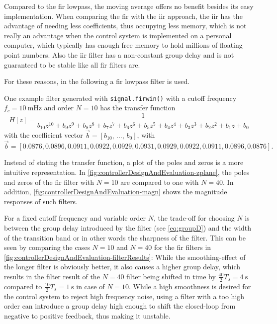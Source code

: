 Compared to the \gls{fir} lowpass, the moving average offers no benefit besides its easy implementation.
When comparing the \gls{fir} with the \gls{iir} approach, the \gls{iir} has the advantage of needing less coefficients, thus occupying less memory, which is not really an advantage when the control system is implemented on a personal computer, which typically has enough free memory to hold millions of floating point numbers.
Also the \gls{iir} filter has a non-constant group delay and is not guaranteed to be stable like all \gls{fir} filters are.

For these reasons, in the following a \gls{fir} lowpass filter is used.

One example filter generated with \texttt{signal.firwin()} with a cutoff frequency $f_c=\SI{10}{\milli\hertz}$ and order $N=10$ has the transfer function
\begin{equation}
H[z]=\frac{1}{b_{10} z^{10} + b_{9} z^9 + b_{8} z^8 + b_{7} z^7 + b_{6} z^6 + b_{5} z^5 + b_{4} z^4 + b_{3} z^3  + b_{2} z^2 + b_{1} z + b_{0}}
\end{equation}
with the coefficient vector $\vec{b}=[b_{10},\,...,\,b_0]$, with
\begin{equation}
\vec{b}=[0.0876,0.0896,0.0911,0.0922,0.0929,0.0931,0.0929,0.0922,0.0911,0.0896,0.0876].
\end{equation}

Instead of stating the transfer function, a plot of the poles and zeros is a more intuitive representation. In \autoref{fig:controllerDesignAndEvaluation-zplane}, the poles and zeros of the \gls{fir} filter with $N=10$ are compared to one with $N=40$. In addition, \autoref{fig:controllerDesignAndEvaluation-magn} shows the magnitude responses of such filters.

For a fixed cutoff frequency and variable order $N$, the trade-off for choosing $N$ is between the group delay introduced by the filter (see \autoref{eq:groupD}) and the width of the transition band or in other words the sharpness of the filter. This can be seen by comparing the cases $N=10$ and $N=40$ for the \gls{fir} filters in \autoref{fig:controllerDesignAndEvaluation-filterResults}: While the smoothing-effect of the longer filter is obviously better, it also causes a higher group delay, which results in the filter result of the $N=40$ filter being shifted in time by $\frac{40}{2}T_s = \SI{4}{\second}$ compared to $\frac{10}{2}T_s = \SI{1}{\second}$ in case of $N=10$. While a high smoothness is desired for the control system to reject high frequency noise, using a filter with a too high order can introduce a group delay high enough to shift the closed-loop from negative to positive feedback, thus making it unstable.

